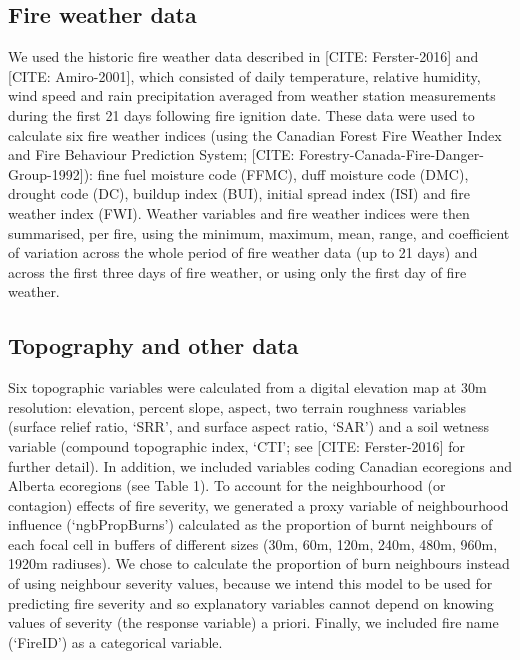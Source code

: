 \documentclass[
  numafflabel,
  authoryear,
  preprint]{elsarticle}
\begin{document}
\subsection{Fire weather data}\label{fire-weather-data}

We used the historic fire weather data described in {[}CITE:
Ferster-2016{]} and {[}CITE: Amiro-2001{]}, which consisted of daily
temperature, relative humidity, wind speed and rain precipitation
averaged from weather station measurements during the first 21 days
following fire ignition date. These data were used to calculate six fire
weather indices (using the Canadian Forest Fire Weather Index and Fire
Behaviour Prediction System; {[}CITE:
Forestry-Canada-Fire-Danger-Group-1992{]}): fine fuel moisture code
(FFMC), duff moisture code (DMC), drought code (DC), buildup index
(BUI), initial spread index (ISI) and fire weather index (FWI). Weather
variables and fire weather indices were then summarised, per fire, using
the minimum, maximum, mean, range, and coefficient of variation across
the whole period of fire weather data (up to 21 days) and across the
first three days of fire weather, or using only the first day of fire
weather.

\subsection{Topography and other data}\label{topography-and-other-data}

Six topographic variables were calculated from a digital elevation map
at 30m resolution: elevation, percent slope, aspect, two terrain
roughness variables (surface relief ratio, `SRR', and surface aspect
ratio, `SAR') and a soil wetness variable (compound topographic index,
`CTI'; see {[}CITE: Ferster-2016{]} for further detail). In addition, we
included variables coding Canadian ecoregions and Alberta ecoregions
(see Table 1). To account for the neighbourhood (or contagion) effects
of fire severity, we generated a proxy variable of neighbourhood
influence (`ngbPropBurns') calculated as the proportion of burnt
neighbours of each focal cell in buffers of different sizes (30m, 60m,
120m, 240m, 480m, 960m, 1920m radiuses). We chose to calculate the
proportion of burn neighbours instead of using neighbour severity
values, because we intend this model to be used for predicting fire
severity and so explanatory variables cannot depend on knowing values of
severity (the response variable) a priori. Finally, we included fire
name (`FireID') as a categorical variable.
\end{document}
